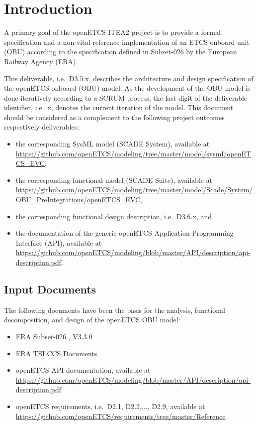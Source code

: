 
\chapter{Introduction}

A primary goal of the openETCS ITEA2 project is to provide a formal specification and a non-vital reference implementation of an ETCS onboard unit (OBU) according to the specification defined in Subset-026 \cite{subset-026} by the European Railway Agency (ERA). 

This deliverable, i.e.~D3.5.x, describes the architecture and design specification of the openETCS onboard (OBU) model. As the development of the OBU model is done iteratively according to a SCRUM process, the last digit of the deliverable identifier, i.e.~x, denotes the current iteration of the model. This document should be considered as a complement to the following project outcomes respectively deliverables:
\begin{itemize}
\item the corresponding SysML model (SCADE System), available at \url{https://github.com/openETCS/modeling/tree/master/model/sysml/openETCS_EVC},
\item the corresponding functional model (SCADE Suite), available at \url{https://github.com/openETCS/modeling/tree/master/model/Scade/System/OBU_PreIntegrations/openETCS_EVC},
\item the corresponding functional design description, i.e.~D3.6.x, and
\item the documentation of the generic openETCS Application Programming Interface (API), available at \url{https://github.com/openETCS/modeling/blob/master/API/description/api-description.pdf}.
\end{itemize}


\section{Input Documents}

The following documents have been the basis for the analysis, functional decomposition, and design of the openETCS OBU model:
\begin{itemize}
\item ERA Subset-026 \cite{subset-026}, V3.3.0
\item ERA TSI CCS Documents
\item openETCS API documentation, available at \url{https://github.com/openETCS/modeling/blob/master/API/description/api-description.pdf}
\item openETCS requirements, i.e.~D2.1, D2.2,$\ldots$, D2.9, available at \url{https://github.com/openETCS/requirements/tree/master/Reference}
\end{itemize}


